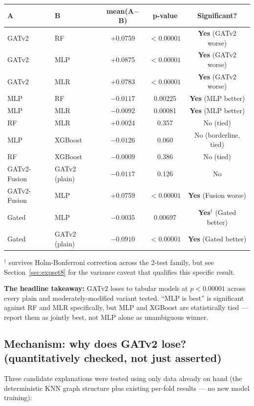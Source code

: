 \documentclass[11pt]{article}
\let\oldsubsection\subsection
\renewcommand{\subsection}[1]{\oldsubsection{\color{sectcolor}#1}}
\begin{document}
\begin{center}
\small
\begin{tabular}{@{}llccc@{}}
\toprule
\textbf{A} & \textbf{B} & mean(A$-$B) & \textbf{p-value} & \textbf{Significant?} \\
\midrule
GATv2 & RF & +0.0759 & $<0.00001$ & \textbf{Yes} (GATv2 worse) \\
GATv2 & MLP & +0.0875 & $<0.00001$ & \textbf{Yes} (GATv2 worse) \\
GATv2 & MLR & +0.0783 & $<0.00001$ & \textbf{Yes} (GATv2 worse) \\
MLP & RF & $-0.0117$ & 0.00225 & \textbf{Yes} (MLP better) \\
MLP & MLR & $-0.0092$ & 0.00081 & \textbf{Yes} (MLP better) \\
RF & MLR & +0.0024 & 0.357 & No (tied) \\
MLP & XGBoost & $-0.0126$ & 0.060 & No (borderline, tied) \\
RF & XGBoost & $-0.0009$ & 0.386 & No (tied) \\
GATv2-Fusion & GATv2 (plain) & $-0.0117$ & 0.126 & No \\
GATv2-Fusion & MLP & +0.0759 & $<0.00001$ & \textbf{Yes} (Fusion worse) \\
Gated & MLP & $-0.0035$ & 0.00697 & \textbf{Yes}$^\dagger$ (Gated better) \\
Gated & GATv2 (plain) & $-0.0910$ & $<0.00001$ & \textbf{Yes} (Gated better) \\
\bottomrule
\end{tabular}
\end{center}
{\footnotesize $^\dagger$ survives Holm-Bonferroni correction across the 2-test family, but
see Section~\ref{sec:expset8} for the variance caveat that qualifies this specific result.}

\textbf{The headline takeaway:} GATv2 loses to tabular models at $p<0.00001$ across every
plain and moderately-modified variant tested. ``MLP is best'' is significant against RF and
MLR specifically, but MLP and XGBoost are statistically tied --- report them as jointly best,
not MLP alone as unambiguous winner.

\subsection{Mechanism: why does GATv2 lose? (quantitatively checked, not just asserted)}
\label{sec:mechanism}
Three candidate explanations were tested using only data already on hand (the deterministic
KNN graph structure plus existing per-fold results --- no new model training):
\end{document}

